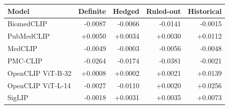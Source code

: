 \begin{tabular}{lrrrr}
\toprule
Model & Definite & Hedged & Ruled-out & Historical \\
\midrule
BiomedCLIP & -0.0087 & -0.0066 & -0.0141 & -0.0015 \\
PubMedCLIP & +0.0050 & +0.0034 & +0.0030 & +0.0112 \\
MedCLIP & -0.0049 & -0.0003 & -0.0056 & -0.0048 \\
PMC-CLIP & -0.0264 & -0.0174 & -0.0381 & -0.0021 \\
OpenCLIP ViT-B-32 & +0.0008 & +0.0002 & +0.0021 & +0.0139 \\
OpenCLIP ViT-L-14 & -0.0027 & -0.0110 & +0.0020 & +0.0256 \\
SigLIP & -0.0018 & +0.0031 & +0.0035 & +0.0073 \\
\bottomrule
\end{tabular}
